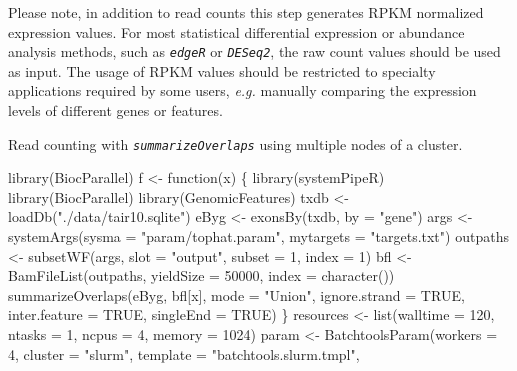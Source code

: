\documentclass[14pt,]{article}
\newcommand{\hlnum}[1]{\textcolor[rgb]{0.816,0.125,0.439}{#1}}%
\newcommand{\hlstr}[1]{\textcolor[rgb]{0.251,0.627,0.251}{#1}}%
\newcommand{\hlstd}[1]{\textcolor[rgb]{0.251,0.251,0.251}{#1}}%
\newcommand{\hlkwc}[1]{\textcolor[rgb]{0.251,0.251,0.251}{#1}}%
\newcommand{\hlkwd}[1]{\textcolor[rgb]{0.878,0.439,0.125}{#1}}%
\newenvironment{Shaded}{\begin{myshaded}}{\end{myshaded}}
\newcommand{\KeywordTok}[1]{\hlkwd{#1}}
\newcommand{\DataTypeTok}[1]{\hlkwc{#1}}
\newcommand{\DecValTok}[1]{\hlnum{#1}}
\newcommand{\StringTok}[1]{\hlstr{#1}}
\newcommand{\OtherTok}[1]{{#1}}
\newcommand{\ControlFlowTok}[1]{\hlkwd{#1}}
\newcommand{\NormalTok}[1]{\hlstd{#1}}
\begin{document}
Please note, in addition to read counts this step generates RPKM normalized expression values. For most statistical differential expression or abundance analysis methods, such as \emph{\texttt{edgeR}} or \emph{\texttt{DESeq2}}, the raw count values should be used as input. The usage of RPKM values should be restricted to specialty applications required by some users, \emph{e.g.} manually comparing the expression levels of different genes or features.

Read counting with \emph{\texttt{summarizeOverlaps}} using multiple nodes of a cluster.

\begin{Shaded}
\begin{Highlighting}[]
\KeywordTok{library}\NormalTok{(BiocParallel)}
\NormalTok{f <-}\StringTok{ }\ControlFlowTok{function}\NormalTok{(x) \{}
    \KeywordTok{library}\NormalTok{(systemPipeR)}
    \KeywordTok{library}\NormalTok{(BiocParallel)}
    \KeywordTok{library}\NormalTok{(GenomicFeatures)}
\NormalTok{    txdb <-}\StringTok{ }\KeywordTok{loadDb}\NormalTok{(}\StringTok{"./data/tair10.sqlite"}\NormalTok{)}
\NormalTok{    eByg <-}\StringTok{ }\KeywordTok{exonsBy}\NormalTok{(txdb, }\DataTypeTok{by =} \StringTok{"gene"}\NormalTok{)}
\NormalTok{    args <-}\StringTok{ }\KeywordTok{systemArgs}\NormalTok{(}\DataTypeTok{sysma =} \StringTok{"param/tophat.param"}\NormalTok{, }\DataTypeTok{mytargets =} \StringTok{"targets.txt"}\NormalTok{)}
\NormalTok{    outpaths <-}\StringTok{ }\KeywordTok{subsetWF}\NormalTok{(args, }\DataTypeTok{slot =} \StringTok{"output"}\NormalTok{, }\DataTypeTok{subset =} \DecValTok{1}\NormalTok{, }\DataTypeTok{index =} \DecValTok{1}\NormalTok{)}
\NormalTok{    bfl <-}\StringTok{ }\KeywordTok{BamFileList}\NormalTok{(outpaths, }\DataTypeTok{yieldSize =} \DecValTok{50000}\NormalTok{, }\DataTypeTok{index =} \KeywordTok{character}\NormalTok{())}
    \KeywordTok{summarizeOverlaps}\NormalTok{(eByg, bfl[x], }\DataTypeTok{mode =} \StringTok{"Union"}\NormalTok{, }\DataTypeTok{ignore.strand =} \OtherTok{TRUE}\NormalTok{, }\DataTypeTok{inter.feature =} \OtherTok{TRUE}\NormalTok{, }
        \DataTypeTok{singleEnd =} \OtherTok{TRUE}\NormalTok{)}
\NormalTok{\}}
\NormalTok{resources <-}\StringTok{ }\KeywordTok{list}\NormalTok{(}\DataTypeTok{walltime =} \DecValTok{120}\NormalTok{, }\DataTypeTok{ntasks =} \DecValTok{1}\NormalTok{, }\DataTypeTok{ncpus =} \DecValTok{4}\NormalTok{, }\DataTypeTok{memory =} \DecValTok{1024}\NormalTok{)}
\NormalTok{param <-}\StringTok{ }\KeywordTok{BatchtoolsParam}\NormalTok{(}\DataTypeTok{workers =} \DecValTok{4}\NormalTok{, }\DataTypeTok{cluster =} \StringTok{"slurm"}\NormalTok{, }\DataTypeTok{template =} \StringTok{"batchtools.slurm.tmpl"}\NormalTok{, }

\end{Highlighting}
\end{Shaded}
\end{document}
